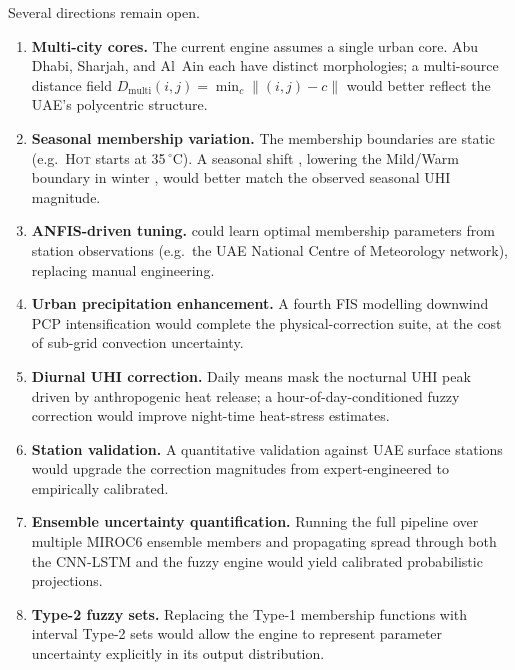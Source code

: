 \documentclass[conference]{IEEEtran}
\begin{document}
Several directions remain open.
\begin{enumerate}[leftmargin=1.5em]
  \item \textbf{Multi-city cores.}  The current engine assumes a single
    urban core.  Abu Dhabi, Sharjah, and Al~Ain each have distinct
    morphologies; a multi-source distance field
    \(D_{\mathrm{multi}}(i,j)=\min_c\|(i,j)-c\|\) would better reflect
    the UAE's polycentric structure.
  \item \textbf{Seasonal membership variation.}  The membership
    boundaries are static (e.g.\ \textsc{Hot} starts at 35\,\(^{\circ}\)C).
    A seasonal shift ,  lowering the Mild/Warm boundary in winter , 
    would better match the observed seasonal UHI magnitude.
  \item \textbf{ANFIS-driven tuning.}  \cite{jang1993anfis} could learn
    optimal membership parameters from station observations (e.g.\ the
    UAE National Centre of Meteorology network), replacing manual
    engineering.
  \item \textbf{Urban precipitation enhancement.}  A fourth FIS modelling
    downwind PCP intensification
    \cite{han2014urbanisation} would complete the physical-correction
    suite, at the cost of sub-grid convection uncertainty.
  \item \textbf{Diurnal UHI correction.}  Daily means mask the
    nocturnal UHI peak driven by anthropogenic heat release; a
    hour-of-day-conditioned fuzzy correction would improve night-time
    heat-stress estimates.
  \item \textbf{Station validation.}  A quantitative validation against
    UAE surface stations would upgrade the correction magnitudes from
    expert-engineered to empirically calibrated.
  \item \textbf{Ensemble uncertainty quantification.}  Running the full
    pipeline over multiple MIROC6 ensemble members and propagating spread
    through both the CNN-LSTM and the fuzzy engine would yield
    calibrated probabilistic projections.
  \item \textbf{Type-2 fuzzy sets.}  Replacing the Type-1 membership
    functions with interval Type-2 sets \cite{mendel2017uncertain}
    would allow the engine to represent parameter uncertainty explicitly
    in its output distribution.
\end{enumerate}
\end{document}
